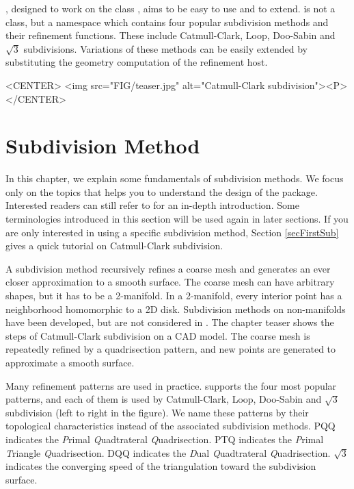 , designed to work on the class 
, aims to be easy to use and to extend.
 is not a class, but a namespace 
which contains four popular subdivision methods and their refinement
functions. These include Catmull-Clark, Loop, Doo-Sabin and 
$\sqrt{3}$ subdivisions. Variations of these methods can be easily 
extended by substituting the geometry computation of the refinement
host.

\begin{ccHtmlOnly}
     <CENTER>
         <img src="FIG/teaser.jpg" alt="Catmull-Clark subdivision"><P>
     </CENTER>
\end{ccHtmlOnly}

\section{Subdivision Method}
\label{secSubAlgo}
In this chapter, we explain some fundamentals of 
subdivision methods. We focus only on the topics that helps you 
to understand the design of the package. Interested readers can
still refer to \cite{cgal:ww-smgd-02} for an in-depth introduction.
Some terminologies introduced in this section will be used again
in later sections. If you are only interested in using a 
specific subdivision method, Section \ref{secFirstSub} 
gives a quick tutorial on Catmull-Clark subdivision.

A subdivision method recursively refines a coarse mesh and 
generates an ever closer approximation to a smooth surface.
The coarse mesh can have arbitrary shapes, but it has to 
be a 2-manifold. In a 2-manifold, every interior point has 
a neighborhood homomorphic to a 2D disk. Subdivision methods
on non-manifolds have been developed, but are not considered
in . 
The chapter teaser shows the steps of Catmull-Clark 
subdivision on a CAD model. The coarse mesh is repeatedly refined 
by a quadrisection pattern, and new points are generated 
to approximate a smooth surface.

Many refinement patterns are used in practice. 
 supports the four most popular 
patterns, and each of them is used by 
Catmull-Clark\cite{cgal:cc-rgbss-78}, Loop, Doo-Sabin 
and $\sqrt{3}$ subdivision (left to right in the 
figure). We name these patterns by their topological
characteristics instead of the associated subdivision methods. 
PQQ indicates the \emph{P}rimal \emph{Q}uadtrateral \emph{Q}uadrisection. 
PTQ indicates the \emph{P}rimal \emph{T}riangle \emph{Q}uadrisection. 
DQQ indicates the \emph{D}ual \emph{Q}uadtrateral \emph{Q}uadrisection.
$\sqrt{3}$ indicates the converging speed of the triangulation toward
the subdivision surface.


